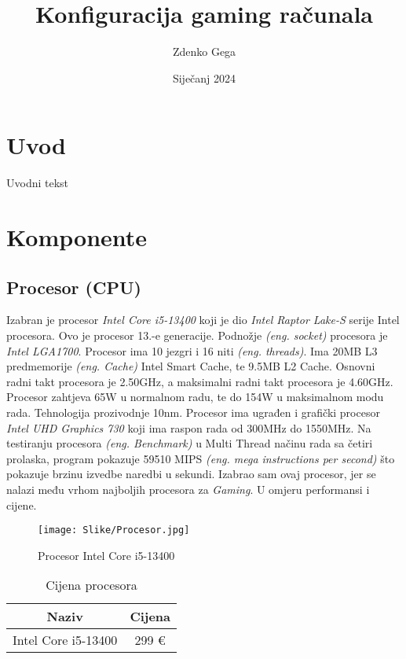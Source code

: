 \documentclass{article}
\title{Konfiguracija gaming računala}
\author{Zdenko Gega}
\date{Siječanj 2024}
\begin{document}
\maketitle
\clearpage
\tableofcontents
\clearpage

\section{Uvod}
Uvodni tekst
\clearpage

\section{Komponente}

    \subsection{Procesor (CPU)}
    Izabran je procesor \textit{Intel Core i5-13400} koji je dio \textit{Intel Raptor Lake-S} serije Intel procesora. Ovo je procesor 13.-e generacije. Podnožje \emph{(eng. socket)} procesora je \textit{Intel LGA1700}. Procesor ima 10 jezgri i 16 niti \emph{(eng. threads)}. Ima 20MB L3 predmemorije \emph{(eng. Cache)} Intel Smart Cache, te 9.5MB L2 Cache. Osnovni radni takt procesora je 2.50GHz, a maksimalni radni takt procesora je 4.60GHz. Procesor zahtjeva 65W u normalnom radu, te do 154W u maksimalnom modu rada. Tehnologija prozivodnje 10nm. Procesor ima ugrađen i grafički procesor \textit{Intel UHD Graphics 730} koji ima raspon rada od 300MHz do 1550MHz. Na testiranju procesora \emph{(eng. Benchmark)} u Multi Thread načinu rada sa četiri prolaska, program pokazuje 59510 MIPS \emph{(eng. mega instructions per second)} što pokazuje brzinu izvedbe naredbi u sekundi. Izabrao sam ovaj procesor, jer se nalazi među vrhom najboljih procesora za \textit{Gaming}. U omjeru performansi i cijene.

    \begin{figure}[H]
        \centering
        \texttt{[image: Slike/Procesor.jpg]}
        \caption{Procesor Intel Core i5-13400}
        \label{fig:Procesor}
    \end{figure}

    \begin{table}[H]
        \centering
        \begin{tabular}{|c|c|}
            \hline
            Naziv & Cijena \\
            \hline
            Intel Core i5-13400 & 299 € \\
            \hline
        \end{tabular}
        \caption{Cijena procesora}
        \label{tab:Procesor}
    \end{table}
    
\end{document}
